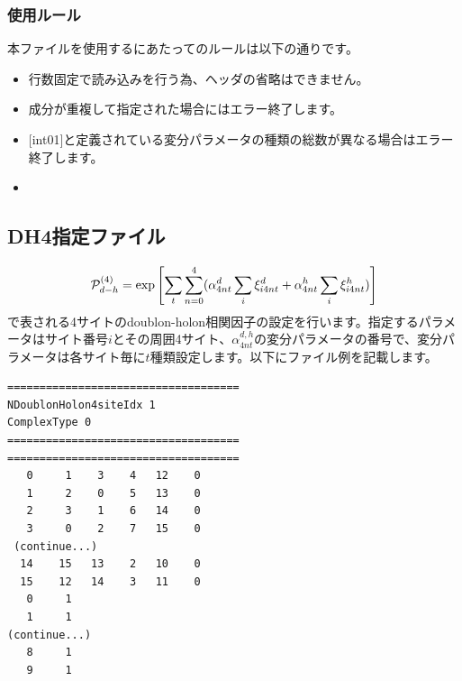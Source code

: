 \subsubsection{使用ルール}
本ファイルを使用するにあたってのルールは以下の通りです。
\begin{itemize}
\item 行数固定で読み込みを行う為、ヘッダの省略はできません。
\item 成分が重複して指定された場合にはエラー終了します。
\item $[$int01$]$と定義されている変分パラメータの種類の総数が異なる場合はエラー終了します。
\item {}
\end{itemize}


\newpage
\subsection{DH4指定ファイル}
\label{Subsec:DH4}

\begin{equation}
{\cal P}_{d-h}^{(4)}= \exp \left[ \sum_t \sum_{n=0}^4 (\alpha_{4nt}^d \sum_{i}\xi_{i4nt}^d+\alpha_{4nt}^h \sum_{i}\xi_{i4nt}^h)\right]
\end{equation}
で表される4サイトのdoublon-holon相関因子の設定を行います。指定するパラメータはサイト番号$i$とその周囲4サイト、$\alpha_{4nt}^{d,h}$の変分パラメータの番号で、変分パラメータは各サイト毎に$t$種類設定します。以下にファイル例を記載します。

\begin{minipage}{12.5cm}
\begin{screen}
\begin{verbatim}
====================================
NDoublonHolon4siteIdx 1  
ComplexType 0
====================================
====================================
   0     1    3    4   12    0
   1     2    0    5   13    0
   2     3    1    6   14    0
   3     0    2    7   15    0
 (continue...)
  14    15   13    2   10    0
  15    12   14    3   11    0
   0     1 
   1     1 
(continue...)
   8     1 
   9     1 
\end{verbatim}
\end{screen}
\end{minipage}


